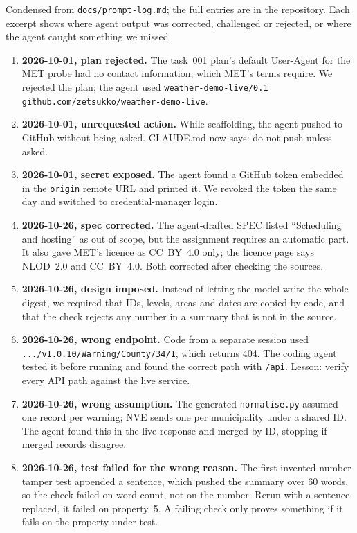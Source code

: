 \documentclass{article}
\newcommand{\code}[1]{\texttt{#1}}
\begin{document}
Condensed from \code{docs/prompt-log.md}; the full entries are in the repository. Each excerpt shows where agent output was corrected, challenged or rejected, or where the agent caught something we missed.

\begin{enumerate}[leftmargin=1.6em,itemsep=3pt]
\item \textbf{2026-10-01, plan rejected.} The task~001 plan's default User-Agent for the MET probe had no contact information, which MET's terms require. We rejected the plan; the agent used \code{weather-demo-live/0.1 github.com/zetsukko/weather-demo-live}.
\item \textbf{2026-10-01, unrequested action.} While scaffolding, the agent pushed to GitHub without being asked. CLAUDE.md now says: do not push unless asked.
\item \textbf{2026-10-01, secret exposed.} The agent found a GitHub token embedded in the \code{origin} remote URL and printed it. We revoked the token the same day and switched to credential-manager login.
\item \textbf{2026-10-26, spec corrected.} The agent-drafted SPEC listed ``Scheduling and hosting'' as out of scope, but the assignment requires an automatic part. It also gave MET's licence as CC~BY~4.0 only; the licence page says NLOD~2.0 and CC~BY~4.0. Both corrected after checking the sources.
\item \textbf{2026-10-26, design imposed.} Instead of letting the model write the whole digest, we required that IDs, levels, areas and dates are copied by code, and that the check rejects any number in a summary that is not in the source.
\item \textbf{2026-10-26, wrong endpoint.} Code from a separate session used \code{.../v1.0.10/Warning/County/34/1}, which returns 404. The coding agent tested it before running and found the correct path with \code{/api}. Lesson: verify every API path against the live service.
\item \textbf{2026-10-26, wrong assumption.} The generated \code{normalise.py} assumed one record per warning; NVE sends one per municipality under a shared ID. The agent found this in the live response and merged by ID, stopping if merged records disagree.
\item \textbf{2026-10-26, test failed for the wrong reason.} The first invented-number tamper test appended a sentence, which pushed the summary over 60 words, so the check failed on word count, not on the number. Rerun with a sentence replaced, it failed on property~5. A failing check only proves something if it fails on the property under test.

\end{enumerate}
\end{document}
